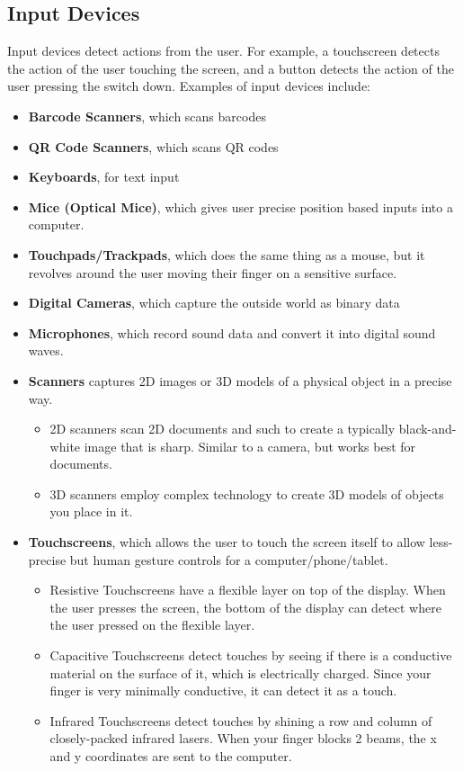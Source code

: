 \documentclass[../main.tex]{subfiles}
\begin{document}
\subsection{Input Devices}

Input devices detect actions from the user. For example, a touchscreen detects the action of the user touching the screen, and a button detects the action of the user pressing the switch down. Examples of input devices include:

\begin{itemize}
    \item \textbf{Barcode Scanners}, which scans barcodes
    \item \textbf{QR Code Scanners}, which scans QR codes
    \item \textbf{Keyboards}, for text input
    \item \textbf{Mice (Optical Mice)}, which gives user precise position based inputs into a computer.
    \item \textbf{Touchpads/Trackpads}, which does the same thing as a mouse, but it revolves around the user moving their finger on a sensitive surface.
    \item \textbf{Digital Cameras}, which capture the outside world as binary data
    \item \textbf{Microphones}, which record sound data and convert it into digital sound waves.
    \item \textbf{Scanners} captures 2D images or 3D models of a physical object in a precise way.
        \begin{itemize}
            \item 2D scanners scan 2D documents and such to create a typically black-and-white image that is sharp. Similar to a camera, but works best for documents.
            \item 3D scanners employ complex technology to create 3D models of objects you place in it.
        \end{itemize}
    \item \textbf{Touchscreens}, which allows the user to touch the screen itself to allow less-precise but human gesture controls for a computer/phone/tablet.
        \begin{itemize}
            \item Resistive Touchscreens have a flexible layer on top of the display. When the user presses the screen, the bottom of the display can detect where the user pressed on the flexible layer.
            \item Capacitive Touchscreens detect touches by seeing if there is a conductive material on the surface of it, which is electrically charged. Since your finger is very minimally conductive, it can detect it as a touch.
            \item Infrared Touchscreens detect touches by shining a row and column of closely-packed infrared lasers. When your finger blocks 2 beams, the x and y coordinates are sent to the computer.
        \end{itemize}
\end{itemize}
\end{document}
